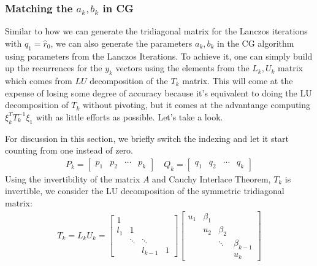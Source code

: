 \documentclass[]{article}
\theoremstyle{definition}
\begin{document}
        \subsubsection{Matching the $a_k, b_k$ in CG}
            Similar to how we can generate the tridiagonal matrix for the Lanczos iterations with $q_1 = \hat{r}_0$, we can also generate the parameters $a_k, b_k$ in the CG algorithm using parameters from the Lanczos Iterations. To achieve it, one can simply build up the recurrences for the $y_k$ vectors using the elements from the $L_k, U_k$ matrix which comes from $LU$ decomposition of the $T_k$ matrix. This will come at the expense of losing some degree of accuracy because it's equivalent to doing the LU decomposition of $T_k$ without pivoting, but it comes at the advantange computing $\xi_k^TT_k^{-1}\xi_1$  with as little efforts as possible. Let's take a look. 
            \par
            For discussion in this section, we briefly switch the indexing and let it start counting from one instead of zero. 
            \begin{align}
                P_k = \begin{bmatrix}
                    p_1 & p_2& \cdots & p_k
                \end{bmatrix} \quad
                Q_k = \begin{bmatrix}
                    q_1 & q_2 & \cdots & q_k
                \end{bmatrix}
            \end{align}
            Using the invertibility of the matrix $A$ and Cauchy Interlace Theorem, $T_k$ is invertible, we consider the LU decomposition of the symmetric tridiagonal matrix: 
            \begin{align}
                T_k = L_k U_k =
                \begin{bmatrix}
                    1 & & & \\
                    l_1 & 1 & & \\
                    & \ddots& \ddots & 
                    \\
                    & & l_{k - 1} & 1
                \end{bmatrix}\begin{bmatrix}
                    u_1& \beta_1 & & \\
                    & u_2 &\beta_2 & \\
                    & &\ddots & \beta_{k - 1}\\
                    & & & u_k
                \end{bmatrix}
            \end{align}
\end{document}
